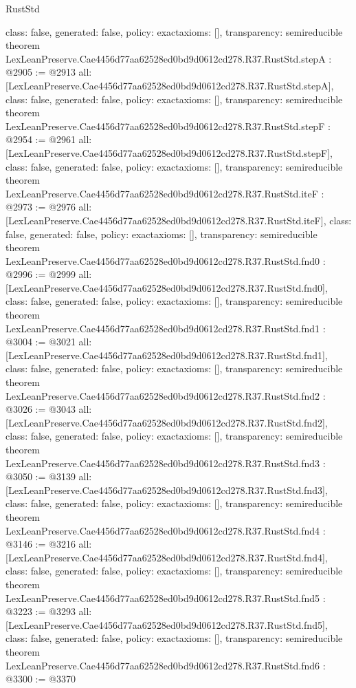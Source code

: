 \begin{lexlean}{RustStd}
\begin{coremodule}
{  class: false,
  generated: false,
  policy: exact{axioms: []},
  transparency: semireducible
}
theorem LexLeanPreserve.Cae4456d77aa62528ed0bd9d0612cd278.R37.RustStd.stepA : @2905 := @2913 {
  all: [LexLeanPreserve.Cae4456d77aa62528ed0bd9d0612cd278.R37.RustStd.stepA],
  class: false,
  generated: false,
  policy: exact{axioms: []},
  transparency: semireducible
}
theorem LexLeanPreserve.Cae4456d77aa62528ed0bd9d0612cd278.R37.RustStd.stepF : @2954 := @2961 {
  all: [LexLeanPreserve.Cae4456d77aa62528ed0bd9d0612cd278.R37.RustStd.stepF],
  class: false,
  generated: false,
  policy: exact{axioms: []},
  transparency: semireducible
}
theorem LexLeanPreserve.Cae4456d77aa62528ed0bd9d0612cd278.R37.RustStd.iteF : @2973 := @2976 {
  all: [LexLeanPreserve.Cae4456d77aa62528ed0bd9d0612cd278.R37.RustStd.iteF],
  class: false,
  generated: false,
  policy: exact{axioms: []},
  transparency: semireducible
}
theorem LexLeanPreserve.Cae4456d77aa62528ed0bd9d0612cd278.R37.RustStd.fnd0 : @2996 := @2999 {
  all: [LexLeanPreserve.Cae4456d77aa62528ed0bd9d0612cd278.R37.RustStd.fnd0],
  class: false,
  generated: false,
  policy: exact{axioms: []},
  transparency: semireducible
}
theorem LexLeanPreserve.Cae4456d77aa62528ed0bd9d0612cd278.R37.RustStd.fnd1 : @3004 := @3021 {
  all: [LexLeanPreserve.Cae4456d77aa62528ed0bd9d0612cd278.R37.RustStd.fnd1],
  class: false,
  generated: false,
  policy: exact{axioms: []},
  transparency: semireducible
}
theorem LexLeanPreserve.Cae4456d77aa62528ed0bd9d0612cd278.R37.RustStd.fnd2 : @3026 := @3043 {
  all: [LexLeanPreserve.Cae4456d77aa62528ed0bd9d0612cd278.R37.RustStd.fnd2],
  class: false,
  generated: false,
  policy: exact{axioms: []},
  transparency: semireducible
}
theorem LexLeanPreserve.Cae4456d77aa62528ed0bd9d0612cd278.R37.RustStd.fnd3 : @3050 := @3139 {
  all: [LexLeanPreserve.Cae4456d77aa62528ed0bd9d0612cd278.R37.RustStd.fnd3],
  class: false,
  generated: false,
  policy: exact{axioms: []},
  transparency: semireducible
}
theorem LexLeanPreserve.Cae4456d77aa62528ed0bd9d0612cd278.R37.RustStd.fnd4 : @3146 := @3216 {
  all: [LexLeanPreserve.Cae4456d77aa62528ed0bd9d0612cd278.R37.RustStd.fnd4],
  class: false,
  generated: false,
  policy: exact{axioms: []},
  transparency: semireducible
}
theorem LexLeanPreserve.Cae4456d77aa62528ed0bd9d0612cd278.R37.RustStd.fnd5 : @3223 := @3293 {
  all: [LexLeanPreserve.Cae4456d77aa62528ed0bd9d0612cd278.R37.RustStd.fnd5],
  class: false,
  generated: false,
  policy: exact{axioms: []},
  transparency: semireducible
}
theorem LexLeanPreserve.Cae4456d77aa62528ed0bd9d0612cd278.R37.RustStd.fnd6 : @3300 := @3370 {
}
\end{coremodule}
\end{lexlean}
